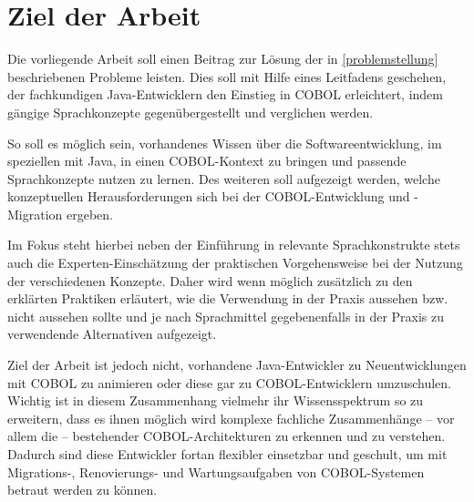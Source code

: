 \section{Ziel der Arbeit}
Die vorliegende Arbeit soll einen Beitrag zur Lösung der in \autoref{problemstellung} beschriebenen Probleme leisten. Dies soll mit Hilfe eines Leitfadens geschehen, der fachkundigen Java-Entwicklern den Einstieg in COBOL erleichtert, indem gängige Sprachkonzepte gegenübergestellt und verglichen werden. 

So soll es möglich sein, vorhandenes Wissen über die Softwareentwicklung, im speziellen mit Java, in einen COBOL-Kontext zu bringen und passende Sprachkonzepte nutzen zu lernen. Des weiteren soll aufgezeigt werden, welche konzeptuellen Herausforderungen sich bei der COBOL-Entwicklung und -Migration ergeben.

Im Fokus steht hierbei neben der Einführung in relevante Sprachkonstrukte stets auch die Experten-Einschätzung der praktischen Vorgehensweise bei der Nutzung der verschiedenen Konzepte. Daher wird wenn möglich zusätzlich zu den erklärten Praktiken erläutert, wie die Verwendung in der Praxis aussehen bzw. nicht aussehen sollte und je nach Sprachmittel gegebenenfalls in der Praxis zu verwendende Alternativen aufgezeigt.

Ziel der Arbeit ist jedoch nicht, vorhandene Java-Entwickler zu Neuentwicklungen mit COBOL zu animieren oder diese gar zu COBOL-Entwicklern umzuschulen. Wichtig ist in diesem Zusammenhang vielmehr ihr Wissensspektrum so zu erweitern, dass es ihnen möglich wird komplexe fachliche Zusammenhänge -- vor allem die  -- bestehender COBOL-Architekturen zu erkennen und zu verstehen. Dadurch sind diese Entwickler fortan flexibler einsetzbar und geschult, um mit Migrations-, Renovierungs- und Wartungsaufgaben von COBOL-Systemen betraut werden zu können.